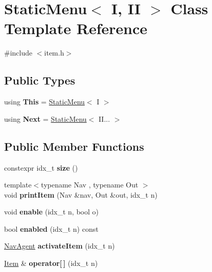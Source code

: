 \hypertarget{classStaticMenu}{}\section{Static\+Menu$<$ I, II $>$ Class Template Reference}
\label{classStaticMenu}


{\ttfamily \#include $<$item.\+h$>$}

\subsection*{Public Types}
\begin{DoxyCompactItemize}
\item 
\mbox{\label{classStaticMenu_af5a92e27a1dc146ef1a6facfb870b245}} 
using {\bfseries This} = \hyperlink{classStaticMenu}{Static\+Menu}$<$ I $>$
\item 
\mbox{\label{classStaticMenu_a85c856832cde6a24cdfff1fa28891017}} 
using {\bfseries Next} = \hyperlink{classStaticMenu}{Static\+Menu}$<$ I\+I... $>$
\end{DoxyCompactItemize}
\subsection*{Public Member Functions}
\begin{DoxyCompactItemize}
\item 
\mbox{\label{classStaticMenu_a7b958c98761a7974d927041f9c659779}} 
constexpr idx\+\_\+t {\bfseries size} ()
\item 
\mbox{\label{classStaticMenu_a0cb879980a1886111d9d6307510ca7c9}} 
{\footnotesize template$<$typename Nav , typename Out $>$ }\\void {\bfseries print\+Item} (Nav \&nav, Out \&out, idx\+\_\+t n)
\item 
\mbox{\label{classStaticMenu_ad92d5faa9b949038b1fbfe77e20a6674}} 
void {\bfseries enable} (idx\+\_\+t n, bool o)
\item 
\mbox{\label{classStaticMenu_ab7a3a6c422252f5d2cc467bed2d36e2c}} 
bool {\bfseries enabled} (idx\+\_\+t n) const
\item 
\mbox{\label{classStaticMenu_a6f5156578dd2e98db3c40c89ed39d95c}} 
\hyperlink{structNavAgent}{Nav\+Agent} {\bfseries activate\+Item} (idx\+\_\+t n)
\item 
\mbox{\label{classStaticMenu_a1ef04ba5f942835bdf8529058defed88}} 
\hyperlink{structItem}{Item} \& {\bfseries operator\mbox{[}$\,$\mbox{]}} (idx\+\_\+t n)
\end{DoxyCompactItemize}
